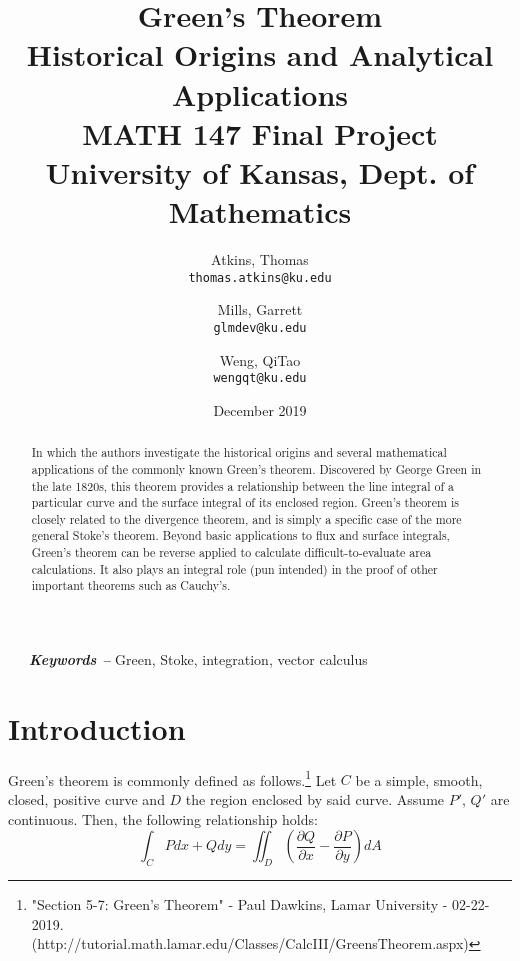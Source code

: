 \documentclass[11pt,English]{article}
\title{
Green's Theorem\\
    \large Historical Origins and Analytical Applications\\
    \small MATH 147 Final Project\\
    \small University of Kansas, Dept. of Mathematics
}
\author{
    Atkins, Thomas\\
    \texttt{thomas.atkins@ku.edu}
    \and
    Mills, Garrett\\
    \texttt{glmdev@ku.edu}
    \and
    Weng, QiTao\\
    \texttt{wengqt@ku.edu}
}
\date{December 2019}
\providecommand{\keywords}[1]
{
  \small	
  \-\ \-\ \-\ \textbf{\textit{Keywords --}} #1
}
\begin{document}
\maketitle
\begin{abstract}
    In which the authors investigate the historical origins and several mathematical applications of the commonly known Green's theorem. Discovered by George Green in the late 1820s, this theorem provides a relationship between the line integral of a particular curve and the surface integral of its enclosed region. Green's theorem is closely related to the divergence theorem, and is simply a specific case of the more general Stoke's theorem. Beyond basic applications to flux and surface integrals, Green's theorem can be reverse applied to calculate difficult-to-evaluate area calculations. It also plays an integral role (pun intended) in the proof of other important theorems such as Cauchy's.
\end{abstract}

\keywords{Green, Stoke, integration, vector calculus}

\section{Introduction}

Green's theorem is commonly defined as follows.\footnote{"Section 5-7: Green's Theorem" - Paul Dawkins, Lamar University - 02-22-2019. (http://tutorial.math.lamar.edu/Classes/CalcIII/GreensTheorem.aspx)} Let $C$ be a simple, smooth, closed, positive curve and $D$ the region enclosed by said curve. Assume $P'$, $Q'$ are continuous. Then, the following relationship holds:
$$
\int_C{ P dx + Q dy } = \iint_D{ \left( \frac{\partial Q}{\partial x} - \frac{\partial P}{\partial y} \right) dA }
$$
\end{document}
